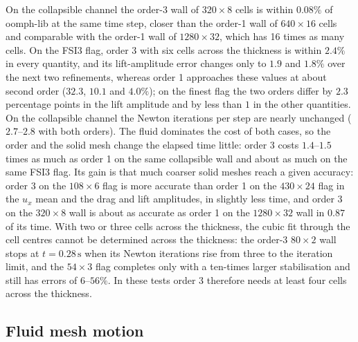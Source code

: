 On the collapsible channel the order-3 wall of $320\times8$ cells is within $0.08\%$ of oomph-lib at the same time step, closer than the order-1 wall of $640\times16$ cells and comparable with the order-1 wall of $1280\times32$, which has 16 times as many cells.
On the FSI3 flag, order 3 with six cells across the thickness is within $2.4\%$ in every quantity, and its lift-amplitude error changes only to $1.9$ and $1.8\%$ over the next two refinements, whereas order 1 approaches these values at about second order ($32.3$, $10.1$ and $4.0\%$); on the finest flag the two orders differ by $2.3$ percentage points in the lift amplitude and by less than $1$ in the other quantities.
On the collapsible channel the Newton iterations per step are nearly unchanged ($2.7$--$2.8$ with both orders).
The fluid dominates the cost of both cases, so the order and the solid mesh change the elapsed time little: order 3 costs $1.4$--$1.5$ times as much as order 1 on the same collapsible wall and about as much on the same FSI3 flag.
Its gain is that much coarser solid meshes reach a given accuracy: order 3 on the $108\times6$ flag is more accurate than order 1 on the $430\times24$ flag in the $u_x$ mean and the drag and lift amplitudes, in slightly less time, and order 3 on the $320\times8$ wall is about as accurate as order 1 on the $1280\times32$ wall in $0.87$ of its time.
With two or three cells across the thickness, the cubic fit through the cell centres cannot be determined across the thickness: the order-3 $80\times2$ wall stops at $t = 0.28\,\mathrm{s}$ when its Newton iterations rise from three to the iteration limit, and the $54\times3$ flag completes only with a ten-times larger stabilisation and still has errors of $6$--$56\%$.
In these tests order 3 therefore needs at least four cells across the thickness.


\subsection{Fluid mesh motion}\label{sec:lim_mesh_motion}

